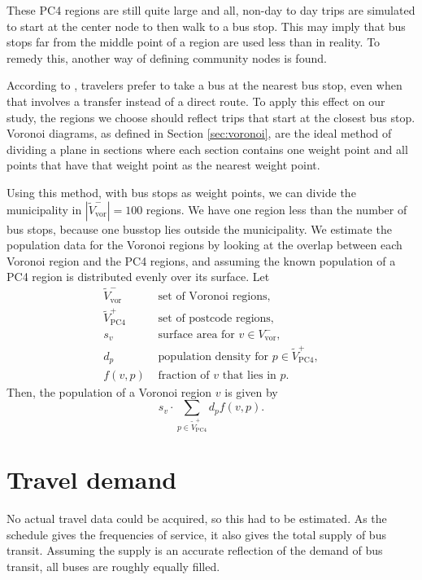 These PC4 regions are still quite large and all, non-day to day trips are simulated to start at the center node to then walk to a bus stop. This may imply that bus stops far from the middle point of a region are used less than in reality. To remedy this, another way of defining community nodes is found.

According to \cite{wang}, travelers prefer to take a bus at the nearest bus stop, even when that involves a transfer instead of a direct route. To apply this effect on our study, the regions we choose should reflect trips that start at the closest bus stop. Voronoi diagrams, as defined in Section \ref{sec:voronoi}, are the ideal method of dividing a plane in sections where each section contains one weight point and all points that have that weight point as the nearest weight point.

Using this method, with bus stops as weight  points, we can divide the municipality in $|\tilde V^-_\text{vor}| = 100$ regions. We have one region less than the number of bus stops, because one busstop lies outside the municipality. We estimate the population data for the Voronoi regions by looking at the overlap between each Voronoi region and the PC4 regions, and assuming the known population of a PC4 region is distributed evenly over its surface. Let
\begin{align*}
    \tilde V^-_\text{vor} & \text{ set of Voronoi regions},                             \\
    \tilde V^+_\text{PC4} & \text{ set of postcode regions},                            \\
    s_v                   & \text{ surface area for } v\in V^-_\text{vor},              \\
    d_p                   & \text{ population density for } p\in \tilde V^+_\text{PC4}, \\
    f(v, p)               & \text{ fraction of }v \text{ that lies in }p.
\end{align*}
Then, the population of a Voronoi region $v$ is given by
\begin{equation*}
    s_v \cdot \sum_{p\in \tilde V^+_\text{PC4}} d_p f(v,p).
\end{equation*}

\section{Travel demand}\label{sec:OD-data}
No actual travel data could be acquired, so this had to be estimated. As the schedule gives the frequencies of service, it also gives the total supply of bus transit. Assuming the supply is an accurate reflection of the demand of bus transit, all buses are roughly equally filled.

